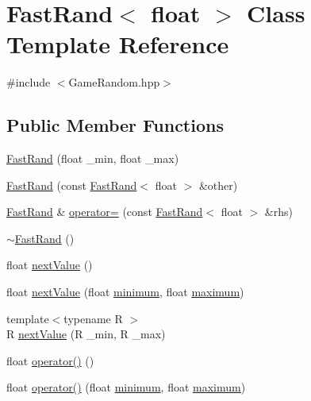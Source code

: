\hypertarget{class_fast_rand_3_01float_01_4}{\section{Fast\-Rand$<$ float $>$ Class Template Reference}
\label{class_fast_rand_3_01float_01_4}
}


{\ttfamily \#include $<$Game\-Random.\-hpp$>$}

\subsection*{Public Member Functions}
\begin{DoxyCompactItemize}
\item 
\hyperlink{class_fast_rand_3_01float_01_4_a98cfd447b11c68e802677e755ba22ed1}{Fast\-Rand} (float \-\_\-min, float \-\_\-max)
\item 
\hyperlink{class_fast_rand_3_01float_01_4_a43fd43609d726d7915377a2db40caef9}{Fast\-Rand} (const \hyperlink{class_fast_rand}{Fast\-Rand}$<$ float $>$ \&other)
\item 
\hyperlink{class_fast_rand}{Fast\-Rand} \& \hyperlink{class_fast_rand_3_01float_01_4_a46766338973745f00b79cdb7aa853f06}{operator=} (const \hyperlink{class_fast_rand}{Fast\-Rand}$<$ float $>$ \&rhs)
\item 
\hyperlink{class_fast_rand_3_01float_01_4_a5f67d167bf339f6cd8a72633e2048b84}{$\sim$\-Fast\-Rand} ()
\item 
float \hyperlink{class_fast_rand_3_01float_01_4_a71d500ffe9747a14a022c681617850ab}{next\-Value} ()
\item 
float \hyperlink{class_fast_rand_3_01float_01_4_ab58d2a5a5012cef82ccee2868c795301}{next\-Value} (float \hyperlink{class_fast_rand_3_01float_01_4_aa7c4d17d121e31bbc2b815f1f9a5b204}{minimum}, float \hyperlink{class_fast_rand_3_01float_01_4_a3d2416ee22bca8371f35b24a16c65165}{maximum})
\item 
{\footnotesize template$<$typename R $>$ }\\R \hyperlink{class_fast_rand_3_01float_01_4_a20c92c980181d7f5f426cb0fac2bf360}{next\-Value} (R \-\_\-min, R \-\_\-max)
\item 
float \hyperlink{class_fast_rand_3_01float_01_4_a46ebbefe6b9aa32ff4328108bb18bcb1}{operator()} ()
\item 
float \hyperlink{class_fast_rand_3_01float_01_4_ae50a67d03024a5aaf7cd7cf5b72a9a62}{operator()} (float \hyperlink{class_fast_rand_3_01float_01_4_aa7c4d17d121e31bbc2b815f1f9a5b204}{minimum}, float \hyperlink{class_fast_rand_3_01float_01_4_a3d2416ee22bca8371f35b24a16c65165}{maximum})
\end{DoxyCompactItemize}
